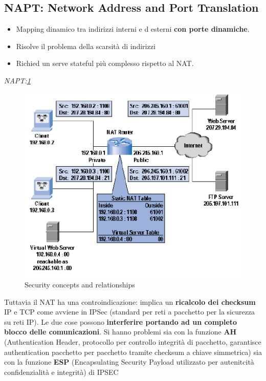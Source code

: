 \documentclass[12pt]{article}
\begin{document}
		\subsection{NAPT: Network Address and Port Translation}
			\begin{itemize}
				\item Mapping dinamico tra indirizzi interni e d esterni \textbf{con porte dinamiche}.
				\item Risolve il problema della scarsità di indirizzi
				\item Richied un serve stateful più complesso rispetto al NAT.
			\end{itemize}
			
			\textit{NAPT:\ref{fig:4}}
			\begin{figure}[h!]
				\centering
				\includegraphics[scale=0.60]{img/natp.PNG}
				\caption{Security concepts and relationships\label{fig:4}}
			\end{figure}
			
			Tuttavia il NAT ha una controindicazione: implica un \textbf{ricalcolo dei checksum} IP e TCP come avviene in IPSec (standard per reti a pacchetto per la sicurezza su reti IP). Le due cose possono \textbf{interferire portando ad un completo blocco delle comunicazioni}. Si hanno problemi sia con la funzione \textbf{AH} (Authentication Header, protocollo per controllo integrità di pacchetto, garantisce authentication pacchetto per pacchetto tramite checksum a chiave simmetrica) sia con la funzione \textbf{ESP} (Encapsulating Security Payload utilizzato per autenitcità confidenzialità e integrità) di IPSEC\\
			
\end{document}
